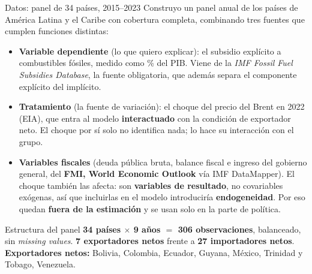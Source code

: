 \documentclass[aspectratio=169,10pt]{beamer}
\newcommand{\key}[1]{{\bfseries\color{AcentoRojo}#1}}
\begin{document}
\begin{frame}{Datos: panel de 34 países, 2015--2023}
  \small
  Construyo un panel anual de los países de América Latina y el Caribe con cobertura completa,
  combinando tres fuentes que cumplen funciones distintas:
  \begin{itemize}
    \item \textbf{Variable dependiente} (lo que quiero explicar): el subsidio explícito a
          combustibles fósiles, medido como \% del PIB. Viene de la \emph{IMF Fossil Fuel
          Subsidies Database}, la fuente obligatoria, que además separa el componente explícito
          del implícito.
    \item \textbf{Tratamiento} (la fuente de variación): el choque del precio del Brent en 2022
          (EIA), que entra al modelo \textbf{interactuado} con la condición de exportador neto.
          El choque por sí solo no identifica nada; lo hace su interacción con el grupo.
    \item \textbf{Variables fiscales} (deuda pública bruta, balance fiscal e ingreso del
          gobierno general, del \textbf{FMI, World Economic Outlook} vía IMF DataMapper). El choque
          también las afecta: son \textbf{variables de resultado}, no covariables exógenas, así que
          incluirlas en el modelo introduciría \textbf{endogeneidad}. Por eso quedan \textbf{fuera
          de la estimación} y se usan solo en la parte de política.
  \end{itemize}

  \begin{block}{Estructura del panel}
    \key{34 países $\times$ 9 años $=$ 306 observaciones}, balanceado, sin \emph{missing values}.
    \textbf{7 exportadores netos} frente a \textbf{27 importadores netos}.\\[0.3em]
    \textbf{Exportadores netos:} Bolivia, Colombia, Ecuador, Guyana, México, Trinidad y Tobago,
    Venezuela.
  \end{block}

\end{frame}
\end{document}
